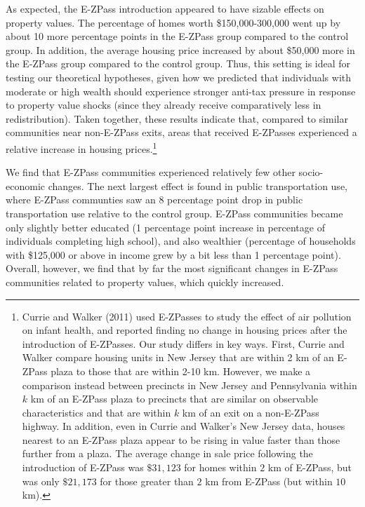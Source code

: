 \documentclass[11.0pt]{article}
\theoremstyle{definition}
\begin{document}
As expected, the E-ZPass introduction appeared to have sizable effects on property values. The percentage of homes worth \$150,000-300,000 went up by about 10 more percentage points in the E-ZPass group compared to the control group. In addition, the average housing price increased by about \$50,000 more in the E-ZPass group compared to the control group. Thus, this setting is ideal for testing our theoretical hypotheses, given how we predicted that individuals with moderate or high wealth should experience stronger anti-tax pressure in response to property value shocks (since they already receive comparatively less in redistribution). Taken together, these results indicate that, compared to similar communities near non-E-ZPass exits, areas that received E-ZPasses experienced a relative increase in housing prices.\footnote{Currie and Walker (2011) used E-ZPasses to study the effect of air pollution on infant health, and reported finding no change in housing prices after the introduction of E-ZPasses. Our study differs in key ways. First, Currie and Walker compare housing units in New Jersey that are within 2 km of an E-ZPass plaza to those that are within 2-10 km. However, we make a comparison instead between precincts in New Jersey and Pennsylvania within $k$ km of an E-ZPass plaza to precincts that are similar on observable characteristics and that are within $k$ km of an exit on a non-E-ZPass highway. In addition, even in Currie and Walker's New Jersey data, houses nearest to an E-ZPass plaza appear to be rising in value faster than those further from a plaza. The average change in sale price following the introduction of E-ZPass was $\$31,123$ for homes within $2$ km of E-ZPass, but was only $\$21,173$ for those greater than $2$ km from E-ZPass (but within $10$ km).} 

We find that E-ZPass communities experienced relatively few other socio-economic changes. The next largest effect is found in public transportation use, where E-ZPass communties saw an 8 percentage point drop in public transportation use relative to the control group. E-ZPass communities became only slightly better educated (1 percentage point increase in percentage of individuals completing high school), and also wealthier (percentage of households with \$125,000 or above in income grew by a bit less than 1 percentage point). Overall, however, we find that by far the most significant changes in E-ZPass communities related to property values, which quickly increased. 
\end{document}
